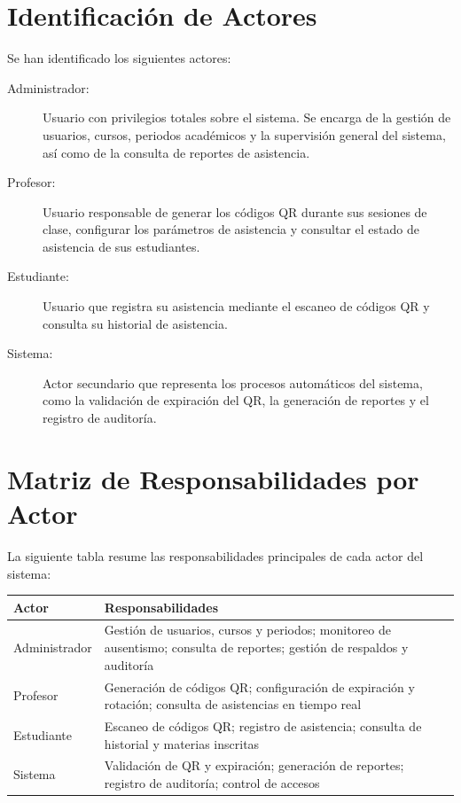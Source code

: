 \documentclass[12pt, letterpaper, oneside]{report}
\begin{document}
\section{Identificaci\'on de Actores}

Se han identificado los siguientes actores:

\begin{description}
  \item[Administrador:] Usuario con privilegios totales sobre el sistema. Se encarga de la gesti\'on de usuarios, cursos, periodos acad\'emicos y la supervisi\'on general del sistema, as\'i como de la consulta de reportes de asistencia.
  \item[Profesor:] Usuario responsable de generar los c\'odigos QR durante sus sesiones de clase, configurar los par\'ametros de asistencia y consultar el estado de asistencia de sus estudiantes.
  \item[Estudiante:] Usuario que registra su asistencia mediante el escaneo de c\'odigos QR y consulta su historial de asistencia.
  \item[Sistema:] Actor secundario que representa los procesos autom\'aticos del sistema, como la validaci\'on de expiraci\'on del QR, la generaci\'on de reportes y el registro de auditor\'ia.
\end{description}

\section{Matriz de Responsabilidades por Actor}

La siguiente tabla resume las responsabilidades principales de cada actor del sistema:

\begin{center}
\begin{tabular}{|p{3cm}|p{10.4cm}|}
\hline
\textbf{Actor} & \textbf{Responsabilidades} \\
\hline
Administrador & Gesti\'on de usuarios, cursos y periodos; monitoreo de ausentismo; consulta de reportes; gesti\'on de respaldos y auditor\'ia \\
\hline
Profesor & Generaci\'on de c\'odigos QR; configuraci\'on de expiraci\'on y rotaci\'on; consulta de asistencias en tiempo real \\
\hline
Estudiante & Escaneo de c\'odigos QR; registro de asistencia; consulta de historial y materias inscritas \\
\hline
Sistema & Validaci\'on de QR y expiraci\'on; generaci\'on de reportes; registro de auditor\'ia; control de accesos \\
\hline
\end{tabular}
\end{center}
\end{document}
